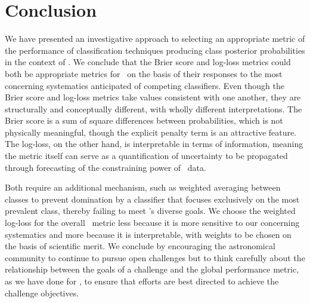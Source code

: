\section{Conclusion}
\label{sec:conclusion}

We have presented an investigative approach to selecting an appropriate metric of the performance of classification techniques producing class posterior probabilities in the context of \plasticc.
We conclude that the Brier score and log-loss metrics could both be appropriate metrics for \plasticc\ on the basis of their responses to the most concerning systematics anticipated of competing classifiers.
Even though the Brier score and log-loss metrics take values consistent with one another, they are structurally and conceptually different, with wholly different interpretations.
The Brier score is a sum of square differences between probabilities, which is not physically meaningful, though the explicit penalty term is an attractive feature.
The log-loss, on the other hand, is interpretable in terms of information, meaning the metric itself can serve as a quantification of uncertainty to be propagated through forecasting of the constraining power of \lsst\ data.

Both require an additional mechanism, such as weighted averaging between classes to prevent domination by a classifier that focuses exclusively on the most prevalent class, thereby failing to meet \plasticc's diverse goals.
We choose the weighted log-loss for the overall \plasticc\ metric less because it is more sensitive to our concerning systematics and more because it is interpretable, with weights to be chosen on the basis of scientific merit.
We conclude by encouraging the astronomical community to continue to pursue open challenges but to think carefully about the relationship between the goals of a challenge and the global performance metric, as we have done for \plasticc, to ensure that efforts are best directed to achieve the challenge objectives.

